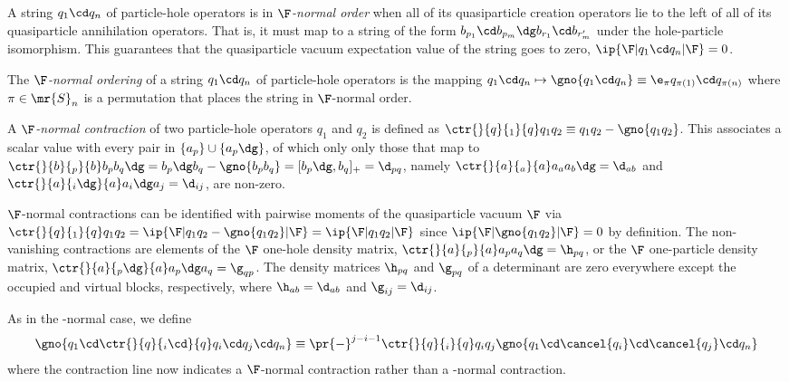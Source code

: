 \documentclass[11pt,fleqn]{article}
\numberwithin{equation}{section}
\begin{document}
\begin{dfn}
A string $q_1\cd q_n$ of particle-hole operators is in \textit{$\F$-normal order} when all of its quasiparticle creation operators lie to the left of all of its quasiparticle annihilation operators.
That is, it must map to a string of the form $b_{p_1}\cd b_{p_m}\dg b_{r_1}\cd b_{r_m'}$ under the hole-particle isomorphism.
This guarantees that the quasiparticle vacuum expectation value of the string goes to zero, $\ip{\F|q_1\cd q_n|\F}=0$.
\end{dfn}

\begin{dfn}
The \textit{$\F$-normal ordering} of a string $q_1\cd q_n$ of particle-hole operators is the mapping $q_1\cd q_n\mapsto\gno{q_1\cd q_n}\equiv\e_{\pi}q_{\pi(1)}\cd q_{\pi(n)}$ where $\pi\in\mr{S}_n$ is a permutation that places the string in $\F$-normal order.
\end{dfn}

\begin{dfn}
A \textit{$\F$-normal contraction} of two particle-hole operators $q_1$ and $q_2$ is defined as
$\ctr{}{q}{_1}{q}  q_1q_2\equiv q_1q_2-\gno{q_1q_2}$.
This associates a scalar value with every pair in $\{a_p\}\cup\{a_p\dg\}$, of which only only those that map to
$
  \ctr{}{b}{_p}{b} b_pb_q\dg
=
  b_p\dg b_q - \gno{b_p b_q}
=
  [b_p\dg, b_q]_+
=
  \d_{pq}
$,
namely
$
  \ctr{}{a}{_a}{a} a_aa_b\dg
=
  \d_{ab}
$
and
$
  \ctr{}{a}{_i\dg}{a} a_i\dg a_j
=
  \d_{ij}
$,
are non-zero.
\end{dfn}

\begin{dfn}
$\F$-normal contractions can be identified with pairwise moments of the quasiparticle vacuum $\F$ via
$
  \ctr{}{q}{_1}{q} q_1q_2
=
  \ip{\F|q_1q_2-\gno{q_1q_2}|\F}
=
  \ip{\F|q_1q_2|\F}
$
since $\ip{\F|\gno{q_1q_2}|\F}=0$ by definition.
The non-vanishing contractions are elements of
the $\F$ one-hole density matrix,
$\ctr{}{a}{_p}{a}     a_pa_q\dg  = \h_{pq}$,
or the $\F$ one-particle density matrix,
$\ctr{}{a}{_p\dg}{a}  a_p\dg a_q = \g_{qp}$.
The density matrices $\h_{pq}$ and $\g_{pq}$ of a determinant are zero everywhere except the occupied and virtual blocks, respectively, where $\h_{ab}=\d_{ab}$ and $\g_{ij}=\d_{ij}$.
\end{dfn}

\begin{ntt}
As in the \vac-normal case, we define
\begin{align}
  \gno{
    q_1\cd
    \ctr{}{q}{_i\cd}{q} q_i\cd q_j
    \cd q_n
  }
\equiv
  \pr{-}^{j-i-1}
  \ctr{}{q}{_i}{q} q_iq_j
  \gno{q_1\cd\cancel{q_i}\cd\cancel{q_j}\cd q_n}
\end{align}
where the contraction line now indicates a $\F$-normal contraction rather than a \vac-normal contraction.
\end{ntt}
\end{document}

